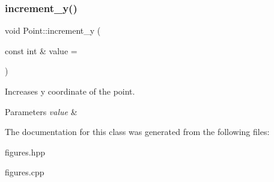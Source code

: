 \subsubsection{\texorpdfstring{increment\+\_\+y()}{increment\_y()}}
{\footnotesize\ttfamily void Point\+::increment\+\_\+y (\begin{DoxyParamCaption}\item[{const int \&}]{value = {} }\end{DoxyParamCaption})}



Increases y coordinate of the point. 


\begin{DoxyParams}{Parameters}
{\em value} & \\
\hline
\end{DoxyParams}


The documentation for this class was generated from the following files\+:\begin{DoxyCompactItemize}
\item 
figures.\+hpp\item 
figures.\+cpp\end{DoxyCompactItemize}
